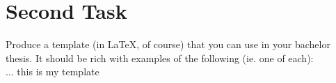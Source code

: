 \section{Second Task}\label{task-2}
Produce a template (in \LaTeX, of course) that you can use in your bachelor
thesis. It should be rich with examples of the following (ie. one of each):\\

... this is my template